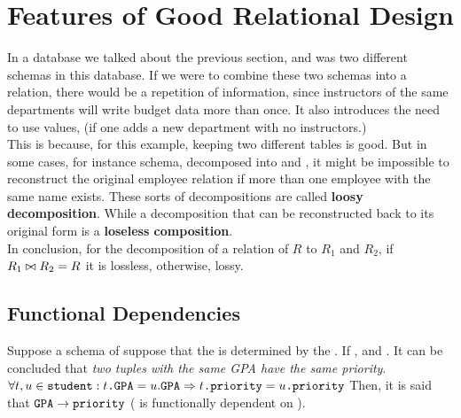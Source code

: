 \documentclass[11pt,a4paper,twocolumn]{book}
\begin{document}
\section{Features of Good Relational Design}

In a database we talked about the previous section,  and  was two different schemas in this database. If we were to combine these two schemas into a relation, there would be a repetition of information, since instructors of the same departments will write budget data more than once. It also introduces the need to use  values, (if one adds a new department with no instructors.)\\

This is because, for this example, keeping two different tables is good. But in some cases, for instance  schema, decomposed into  and , it might be impossible to reconstruct the original employee relation if more than one employee with the same name exists. These sorts of decompositions are called \textbf{loosy decomposition}. While a decomposition that can be reconstructed back to its original form is a \textbf{loseless composition}.\\

In conclusion, for the decomposition of a relation of $R$ to $R_1$ and $R_2$, if $R_1 \bowtie R_2 = R$ it is lossless, otherwise, lossy.

\subsection{Functional Dependencies}

Suppose a schema of  suppose that the  is determined by the . If ,  and . It can be concluded that \textit{two tuples with the same GPA have the same priority}.\\

$\forall t, u \in \texttt{student}: t\texttt{.GPA} = u.\texttt{GPA} \Rightarrow t\texttt{.priority} = u\texttt{.priority}$ Then, it is said that $\texttt{GPA} \rightarrow \texttt{priority}$ ( is functionally dependent on ).\\
\end{document}

